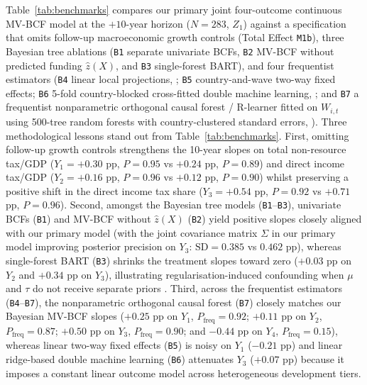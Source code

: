 \documentclass[11pt,a4paper]{article}
\begin{document}
Table~\ref{tab:benchmarks} compares our primary joint four-outcome continuous MV-BCF model at the $+10$-year horizon ($N = 283$, $Z_1$) against a specification that omits follow-up macroeconomic growth controls (Total Effect \texttt{M1b}), three Bayesian tree ablations (\texttt{B1} separate univariate BCFs, \texttt{B2} MV-BCF without predicted funding $\hat{z}(X)$, and \texttt{B3} single-forest BART), and four frequentist estimators (\texttt{B4} linear local projections, \citealt{jorda2005estimation}; \texttt{B5} country-and-wave two-way fixed effects; \texttt{B6} 5-fold country-blocked cross-fitted double machine learning, \citealt{chernozhukov2018double}; and \texttt{B7} a frequentist nonparametric orthogonal causal forest / R-learner fitted on $W_{i,t}$ using 500-tree random forests with country-clustered standard errors, \citealt{athey2019generalized}). Three methodological lessons stand out from Table~\ref{tab:benchmarks}. First, omitting follow-up growth controls strengthens the 10-year slopes on total non-resource tax/GDP ($Y_1 = +0.30$ pp, $P = 0.95$ vs $+0.24$ pp, $P = 0.89$) and direct income tax/GDP ($Y_2 = +0.16$ pp, $P = 0.96$ vs $+0.12$ pp, $P = 0.90$) whilst preserving a positive shift in the direct income tax share ($Y_3 = +0.54$ pp, $P = 0.92$ vs $+0.71$ pp, $P = 0.96$). Second, amongst the Bayesian tree models (\texttt{B1}--\texttt{B3}), univariate BCFs (\texttt{B1}) and MV-BCF without $\hat{z}(X)$ (\texttt{B2}) yield positive slopes closely aligned with our primary model (with the joint covariance matrix $\Sigma$ in our primary model improving posterior precision on $Y_3$: $\text{SD} = 0.385$ vs $0.462$ pp), whereas single-forest BART (\texttt{B3}) shrinks the treatment slopes toward zero ($+0.03$ pp on $Y_2$ and $+0.34$ pp on $Y_3$), illustrating regularisation-induced confounding when $\mu$ and $\tau$ do not receive separate priors \citep{hahn2020bayesian}. Third, across the frequentist estimators (\texttt{B4}--\texttt{B7}), the nonparametric orthogonal causal forest (\texttt{B7}) closely matches our Bayesian MV-BCF slopes ($+0.25$ pp on $Y_1$, $P_{\text{freq}} = 0.92$; $+0.11$ pp on $Y_2$, $P_{\text{freq}} = 0.87$; $+0.50$ pp on $Y_3$, $P_{\text{freq}} = 0.90$; and $-0.44$ pp on $Y_4$, $P_{\text{freq}} = 0.15$), whereas linear two-way fixed effects (\texttt{B5}) is noisy on $Y_1$ ($-0.21$ pp) and linear ridge-based double machine learning (\texttt{B6}) attenuates $Y_3$ ($+0.07$ pp) because it imposes a constant linear outcome model across heterogeneous development tiers.
\end{document}

